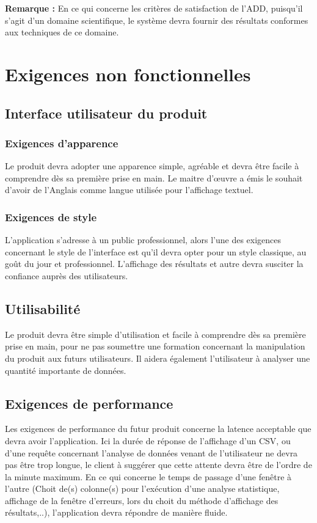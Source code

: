 			\textbf{Remarque :} En ce qui concerne les critères de satisfaction de l'ADD, puisqu'il s'agit d'un domaine scientifique, le système devra fournir des résultats conformes aux techniques de ce domaine.
	
	
	\section{Exigences non fonctionnelles}
		\subsection{Interface utilisateur du produit}
		
			\subsubsection{Exigences d’apparence} 
			Le produit devra adopter une apparence simple, agréable et devra être facile à comprendre dès sa première prise en main.
			Le maitre d’œuvre a émis le souhait d’avoir de l’Anglais comme langue utilisée pour l’affichage textuel.

			\subsubsection{Exigences de style}
			L’application s’adresse à un public professionnel, alors l’une des exigences concernant le style de l’interface est qu’il devra opter pour un style classique, au goût du jour et professionnel. L’affichage des résultats et autre devra susciter la confiance auprès des utilisateurs.

		\subsection{Utilisabilité}
		Le produit devra être simple d’utilisation et facile à comprendre dès sa première prise en main, pour ne pas soumettre une formation concernant la manipulation du produit aux futurs utilisateurs.
		Il aidera également l’utilisateur à analyser une quantité importante de données.

		\subsection{Exigences de performance} 

		Les exigences de performance du futur produit concerne la latence acceptable que devra avoir l'application. Ici la durée de réponse de l’affichage d’un CSV, ou d’une requête concernant l’analyse de données venant de l’utilisateur ne devra pas être trop longue, le client à suggérer que cette attente devra être de l’ordre de la minute maximum. En ce qui concerne le temps de passage d'une fenêtre à l'autre (Choit de(s) colonne(s) pour l'exécution d'une analyse statistique, affichage de la fenêtre d'erreurs, lors du choit du méthode d’affichage des résultats,..), l’application devra répondre de manière fluide. 

